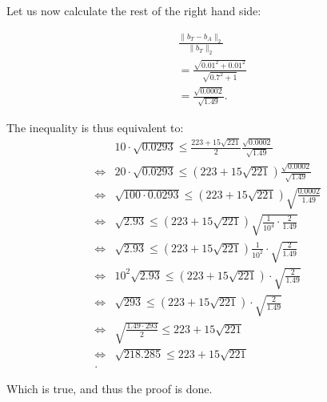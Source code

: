 \documentclass[10pt]{article}
\begin{document}
\begin{solution}[4]
Let us now calculate the rest of the right hand side:

\begin{align*}
 &  \frac{\| b_T - b_A \| _{2}}{\| b_T \| _{2}} \\
& = \frac{\sqrt{0.01 ^2 + 0.01 ^2}}{\sqrt{0.7 ^2 + 1}} \\
& = \frac{\sqrt{0.0002}}{\sqrt{1.49}} 
.
\end{align*}

The inequality is thus equivalent to:
\begin{align*}
 &  10 \cdot \sqrt{0.0293} \leq \frac{223 + 15 \sqrt{221}}{2} \frac{\sqrt{0.0002}}{\sqrt{1.49}} \\
\iff &  20 \cdot \sqrt{0.0293} \leq (223 + 15 \sqrt{221}) \frac{\sqrt{0.0002}}{\sqrt{1.49}} \\
\iff & \sqrt{100 \cdot 0.0293} \leq (223 + 15 \sqrt{221}) \sqrt{\frac{0.0002}{1.49} } \\
\iff & \sqrt{2.93} \leq (223 + 15 \sqrt{221}) \sqrt{\frac{1}{10^{4}} \cdot \frac{2}{1.49}} \\
\iff & \sqrt{2.93} \leq (223 + 15 \sqrt{221}) \frac{1}{10 ^2} \cdot \sqrt{\frac{2}{1.49}} \\
\iff & 10 ^2 \sqrt{2.93} \leq (223 + 15 \sqrt{221}) \cdot \sqrt{\frac{2}{1.49}} \\
\iff &  \sqrt{293} \leq (223 + 15 \sqrt{221}) \cdot \sqrt{\frac{2}{1.49}} \\
\iff &  \sqrt{\frac{1.49 \cdot293}{2}} \leq 223 + 15 \sqrt{221} \\
\iff &  \sqrt{218.285} \leq 223 + 15 \sqrt{221} \\
.
\end{align*}

Which is true, and thus the proof is done.
\end{solution}
\end{document}
